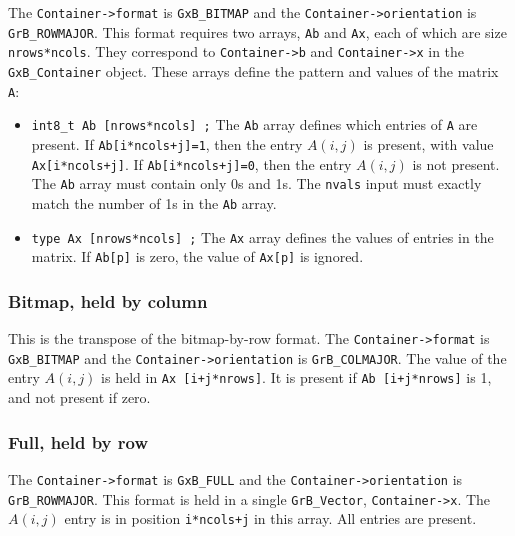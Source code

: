 The \verb'Container->format' is \verb'GxB_BITMAP' and the
\verb'Container->orientation' is \verb'GrB_ROWMAJOR'.
This format requires two arrays, \verb'Ab' and \verb'Ax', each of which are
size \verb'nrows*ncols'.  They correspond to \verb'Container->b' and
\verb'Container->x' in the \verb'GxB_Container' object.  These arrays define
the pattern and values of the matrix \verb'A':

\begin{itemize}
\item \verb'int8_t Ab [nrows*ncols] ;'  The \verb'Ab' array defines which
entries of \verb'A' are present.  If \verb'Ab[i*ncols+j]=1', then the entry
$A(i,j)$ is present, with value \verb'Ax[i*ncols+j]'.  If
\verb'Ab[i*ncols+j]=0', then the entry $A(i,j)$ is not present.  The \verb'Ab'
array must contain only 0s and 1s.  The \verb'nvals' input must exactly match
the number of 1s in the \verb'Ab' array.
\item \verb'type Ax [nrows*ncols] ;'  The \verb'Ax' array defines the values of
entries in the matrix.  If \verb'Ab[p]' is zero, the value of \verb'Ax[p]' is
ignored.
\end{itemize}

\subsubsection{Bitmap, held by column}
\label{format_bitmap_by_col}

This is the transpose of the bitmap-by-row format.
The \verb'Container->format' is \verb'GxB_BITMAP' and the
\verb'Container->orientation' is \verb'GrB_COLMAJOR'.
The value of the entry $A(i,j)$ is held in \verb'Ax [i+j*nrows]'.
It is present if \verb'Ab [i+j*nrows]' is 1, and not present if zero.

\subsubsection{Full, held by row}
\label{format_full_by_row}

The \verb'Container->format' is \verb'GxB_FULL' and the
\verb'Container->orientation' is \verb'GrB_ROWMAJOR'.  This format is held in a
single \verb'GrB_Vector', \verb'Container->x'.  The $A(i,j)$ entry is in
position \verb'i*ncols+j' in this array.  All entries are present.

